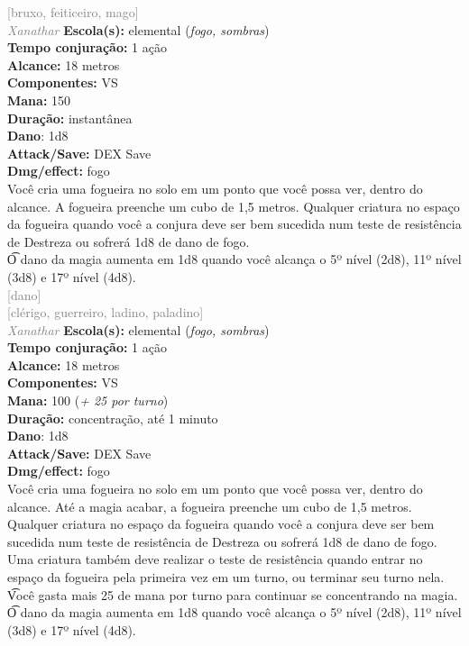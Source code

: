\documentclass{RPG_Adventure}[2021/10/20]
\begin{document}
{\scriptsize \textcolor{gray}{[bruxo, feiticeiro, mago]\\}}
{\tiny \textcolor{gray}{\textit{Xanathar}}}
{\small \t \textbf{Escola(s):} elemental (\textit{fogo, sombras})\\\t \textbf{Tempo conjuração:} 1 ação\\\t \textbf{Alcance:} 18 metros\\\t \textbf{Componentes:} VS\\\t \textbf{Mana:} 150\\\t \textbf{Duração:} instantânea\\\t \textbf{Dano}: 1d8\\\t \textbf{Attack/Save:} DEX Save\\\t \textbf{Dmg/effect:} fogo\\}
{\normalsize Você cria uma fogueira no solo em um ponto que você possa ver, dentro do alcance. A fogueira preenche um cubo de 1,5 metros. Qualquer criatura no espaço da fogueira quando você a conjura deve ser bem sucedida num teste de resistência de Destreza ou sofrerá 1d8 de dano de fogo.\\\t O dano da magia aumenta em 1d8 quando você alcança o 5º nível (2d8), 11º nível (3d8) e 17º nível (4d8).\\}
{\scriptsize \textcolor{gray}{[dano]\\}}
{\scriptsize \textcolor{gray}{[clérigo, guerreiro, ladino, paladino]\\}}
{\tiny \textcolor{gray}{\textit{Xanathar}}}
{\small \t \textbf{Escola(s):} elemental (\textit{fogo, sombras})\\\t \textbf{Tempo conjuração:} 1 ação\\\t \textbf{Alcance:} 18 metros\\\t \textbf{Componentes:} VS\\\t \textbf{Mana:} 100 (\textit{+ 25 por turno})\\\t \textbf{Duração:} concentração, até 1 minuto\\\t \textbf{Dano}: 1d8\\\t \textbf{Attack/Save:} DEX Save\\\t \textbf{Dmg/effect:} fogo\\}
{\normalsize Você cria uma fogueira no solo em um ponto que você possa ver, dentro do alcance. Até a magia acabar, a fogueira preenche um cubo de 1,5 metros. Qualquer criatura no espaço da fogueira quando você a conjura deve ser bem sucedida num teste de resistência de Destreza ou sofrerá 1d8 de dano de fogo. Uma criatura também deve realizar o teste de resistência quando entrar no espaço da fogueira pela primeira vez em um turno, ou terminar seu turno nela.\\\t Você gasta mais 25 de mana por turno para continuar se concentrando na magia.\\\t O dano da magia aumenta em 1d8 quando você alcança o 5º nível (2d8), 11º nível (3d8) e 17º nível (4d8).\\}
\end{document}
